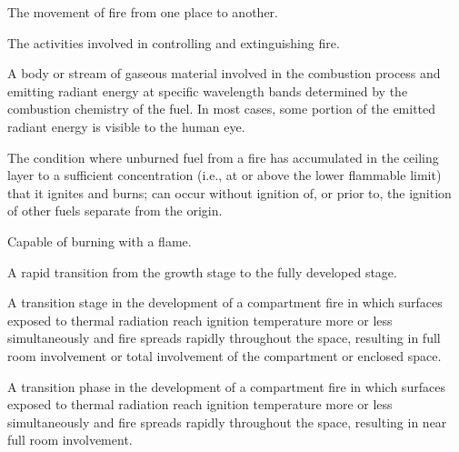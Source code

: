 \begin{description}
\item[Fire Spread] \hfill
\begin{description}[leftmargin=!]
	\item The movement of fire from one place to another.
\end{description}

\item[Fire Suppression] \hfill
\begin{description}[leftmargin=!]
	\item The activities involved in controlling and extinguishing fire.
\end{description}

\item[Flame] \hfill
\begin{description}[leftmargin=!]
	\item A body or stream of gaseous material involved in the combustion process and emitting radiant energy at specific wavelength bands determined by the combustion chemistry of the fuel. In most cases, some portion of the emitted radiant energy is visible to the human eye.
\end{description}

\hypertarget{flameover}{\item[Flameover]} \hfill
\begin{description}[leftmargin=!]
	\item The condition where unburned fuel  from a fire has accumulated in the ceiling layer to a sufficient concentration (i.e., at or above the lower flammable limit) that it ignites and burns; can occur without ignition of, or prior to, the ignition of other fuels separate from the origin.
\end{description}

\item[Flammable] \hfill
\begin{description}[leftmargin=!]
	\item Capable of burning with a flame.
\end{description}

\item[Flashover] \hfill
\begin{description}[leftmargin=!]
	\item A rapid transition from the growth stage to the fully developed stage.
	\item A transition stage in the development of a compartment fire in which surfaces exposed to thermal radiation reach ignition temperature more or less simultaneously and fire spreads rapidly throughout the space, resulting in full room involvement or total involvement of the compartment or enclosed space.
	\item A transition phase in the development of a compartment fire in which surfaces exposed to thermal radiation reach ignition temperature more or less simultaneously and fire spreads rapidly throughout the space, resulting in near full room involvement.
\end{description}


\end{description}
